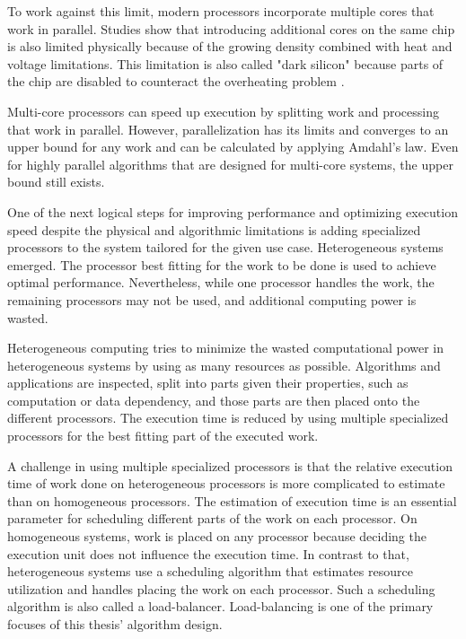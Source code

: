 To work against this limit, modern processors incorporate multiple cores that work in parallel. Studies show that introducing additional cores on the same chip is also limited physically because of the growing density combined with heat and voltage limitations. This limitation is also called "dark silicon" because parts of the chip are disabled to counteract the overheating problem \cite{esmaeilzadehDarkSiliconEnd2011}.

Multi-core processors can speed up execution by splitting work and processing that work in parallel. However, parallelization has its limits and converges to an upper bound for any work and can be calculated by applying Amdahl's law\cite{amdahlValiditySingleProcessor1967}. Even for highly parallel algorithms that are designed for multi-core systems, the upper bound still exists.

One of the next logical steps for improving performance and optimizing execution speed despite the physical and algorithmic limitations is adding specialized processors to the system tailored for the given use case. Heterogeneous systems emerged. The processor best fitting for the work to be done is used to achieve optimal performance. Nevertheless, while one processor handles the work, the remaining processors may not be used, and additional computing power is wasted.

Heterogeneous computing tries to minimize the wasted computational power in heterogeneous systems by using as many resources as possible. Algorithms and applications are inspected, split into parts given their properties, such as computation or data dependency, and those parts are then placed onto the different processors. The execution time is reduced by using multiple specialized processors for the best fitting part of the executed work.

A challenge in using multiple specialized processors is that the relative execution time of work done on heterogeneous processors is more complicated to estimate than on homogeneous processors. The estimation of execution time is an essential parameter for scheduling different parts of the work on each processor. On homogeneous systems, work is placed on any processor because deciding the execution unit does not influence the execution time. In contrast to that, heterogeneous systems use a scheduling algorithm that estimates resource utilization and handles placing the work on each processor. Such a scheduling algorithm is also called a load-balancer. Load-balancing is one of the primary focuses of this thesis' algorithm design.

